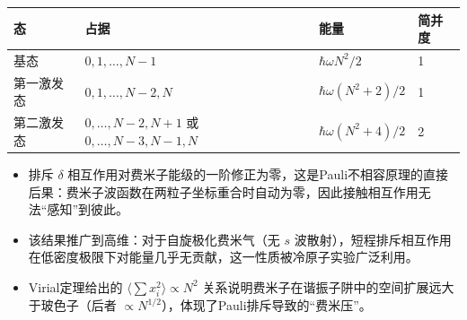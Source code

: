 \begin{formulabox}[答案汇总]
\begin{center}
\begin{tabular}{llll}
\toprule
\textbf{态} & \textbf{占据} & \textbf{能量} & \textbf{简并度} \\
\midrule
基态 & $0,1,\ldots,N-1$ & $\hbar\omega N^2/2$ & 1 \\
第一激发态 & $0,1,\ldots,N-2,N$ & $\hbar\omega(N^2+2)/2$ & 1 \\
第二激发态 & $0,\ldots,N-2,N+1$ 或 $0,\ldots,N-3,N-1,N$ & $\hbar\omega(N^2+4)/2$ & 2 \\
\bottomrule
\end{tabular}
\end{center}
\end{formulabox}

\begin{insightbox}[物理图像]
\begin{itemize}
    \item 排斥 $\delta$ 相互作用对费米子能级的一阶修正为零，这是Pauli不相容原理的直接后果：费米子波函数在两粒子坐标重合时自动为零，因此接触相互作用无法``感知''到彼此。
    \item 该结果推广到高维：对于自旋极化费米气（无 $s$ 波散射），短程排斥相互作用在低密度极限下对能量几乎无贡献，这一性质被冷原子实验广泛利用。
    \item Virial定理给出的 $\langle\sum x_i^2\rangle\propto N^2$ 关系说明费米子在谐振子阱中的空间扩展远大于玻色子（后者 $\propto N^{1/2}$），体现了Pauli排斥导致的``费米压''。
\end{itemize}
\end{insightbox}

